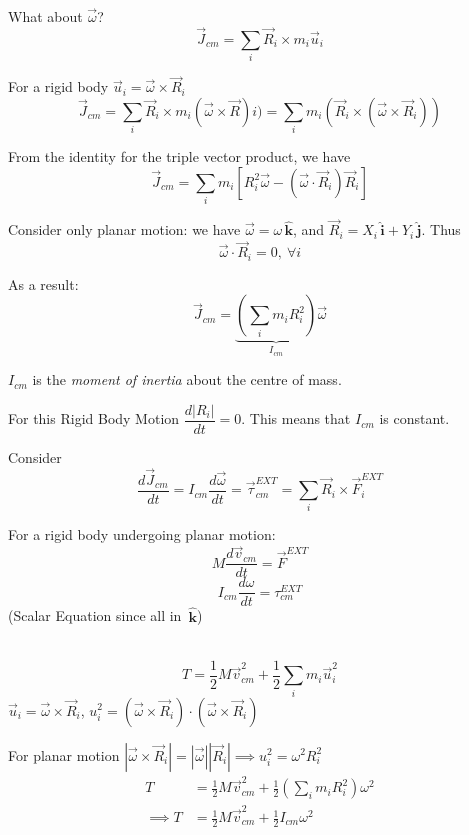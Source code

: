 \documentclass[twoside]{scrartcl}
\let\oldhat\hat
\renewcommand{\hat}[1]{\,\oldhat{\boldsymbol{\mathbf{#1}}}}
\begin{document}
What about $\vec{\omega}$?
\[\vec{J}_{cm} = \sum_i\vec{R}_i\times m_i\vec{u}_i\]

For a rigid body $\vec{u}_i = \vec{\omega}\times\vec{R}_i$
\[\vec{J}_{cm} = \sum_i\vec{R}_i \times m_i(\vec{\omega}\times\vec{R})i) = \sum_i m_i(\vec{R}_i\times(\vec{\omega}\times\vec{R}_i))\]

From the identity for the triple vector product, we have
\[\vec{J}_{cm} = \sum_im_i[R_i^2\vec{\omega} - (\vec{\omega}\cdot\vec{R}_i)\vec{R}_i]\]

Consider only planar motion: we have $\vec{\omega} = \omega\hat{k}$, and $\vec{R}_i = X_i\hat{i} + Y_i\hat{j}$. Thus 
\[\vec{\omega}\cdot\vec{R}_i = 0,~\forall i\]

As a result:
\begin{equation}
\vec{J}_{cm} = \underbrace{(\sum_im_iR_i^2)}_{I_{cm}}\vec{\omega}	
\end{equation}

\begin{definition}
$I_{cm}$ is the \emph{moment of inertia} about the centre of mass.	
\end{definition}

For this Rigid Body Motion $\dfrac{d|R_i|}{dt} = 0$. This means that $I_{cm}$ is constant.

Consider
\[\frac{d\vec{J}_{cm}}{dt} = I_{cm}\frac{d\vec{\omega}}{dt} = \vec{\tau}_{cm}^{EXT} = \sum_i\vec{R}_i\times\vec{F}_i^{EXT}\]

For a rigid body undergoing planar motion:
\begin{equation}M\frac{d\vec{v}_{cm}}{dt} = \vec{F}^{EXT}\end{equation}
\begin{equation}I_{cm}\frac{d{\omega}}{dt} = {\tau}_{cm}^{EXT}\end{equation}
 (Scalar Equation since all in $\hat{k}$)
 
~
\[T = \frac{1}{2}M\vec{v}_{cm}^2 + \frac{1}{2}\sum_im_i\vec{u}_i^2\]
$\vec{u}_i = \vec{\omega} \times \vec{R}_i$, $u_i^ 2 = (\vec{\omega}\times\vec{R}_i) \cdot (\vec{\omega}\times\vec{R}_i)$

For planar motion $|\vec{\omega}\times\vec{R}_i| = |\vec{\omega}||\vec{R}_i| \implies u_i^2 = \omega^2R_i^2$
\[\begin{aligned}T &= \frac{1}{2}M\vec{v}_{cm}^2 + \frac{1}{2}\left(\sum_im_i{R}_i^2\right)\omega^2\\
\implies 	T &= \frac{1}{2}M\vec{v}_{cm}^2 + \frac{1}{2}I_{cm}\omega^2
\end{aligned}
\]
\end{document}

